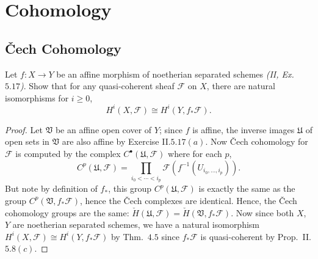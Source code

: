 \documentclass[10pt]{article}
\theoremstyle{definition}
\theoremstyle{remark}
\numberwithin{equation}{section}
\numberwithin{figure}{subsubsection}
\newcommand{\FF}{\mathscr{F}}
\begin{document}
\section{Cohomology}
\setcounter{subsection}{3}
\subsection{\v{C}ech Cohomology}
\begin{problem}
  Let $f\colon X \to Y$ be an affine morphism of noetherian separated schemes
  \emph{(II, Ex.\ $5.17$)}. Show that for any quasi-coherent sheaf $\mathscr{F}$
  on $X$, there are natural isomorphisms for $i \ge 0$,
  \begin{equation*}
    H^i(X,\FF) \cong H^i(Y,f_*\FF).
  \end{equation*}
\end{problem}
\begin{proof}
  Let $\mathfrak{V}$ be an affine open cover of $Y$; since $f$ is affine,
  the inverse images $\mathfrak{U}$ of open sets in $\mathfrak{V}$ are also
  affine by Exercise II.$5.17(a)$. Now \v{C}ech cohomology for $\FF$ is computed
  by the complex $C^\bullet(\mathfrak{U},\FF)$ where for each $p$,
  \[C^p(\mathfrak{U},\FF) = \prod_{i_0 < \cdots < i_p}
  \FF(f^{-1}(U_{i_0,\ldots,i_p})).\]
  But note by definition of $f_*$, this group $C^p(\mathfrak{U},\FF)$ is
  exactly the same as the group $C^p(\mathfrak{V},f_*\FF)$, hence the \v{C}ech
  complexes are identical. Hence, the \v{C}ech cohomology groups are the same:
  $\check{H}(\mathfrak{U},\FF) = \check{H}(\mathfrak{V},f_*\FF)$. Now since both $X$,
  $Y$ are noetherian separated schemes, we have a natural isomorphism
  $H^i(X,\FF) \cong H^i(Y,f_*\FF)$ by Thm.\ $4.5$ since $f_*\FF$ is
  quasi-coherent by Prop.\ II.$5.8(c)$.
\end{proof}
\end{document}
